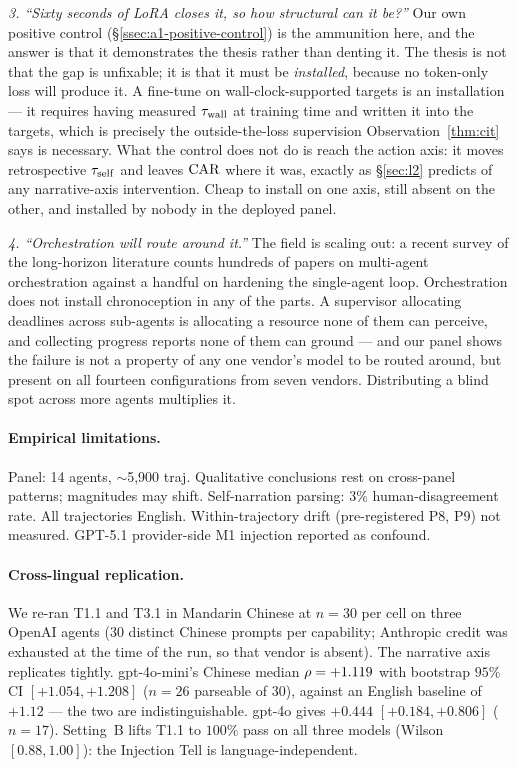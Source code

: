 \emph{3. ``Sixty seconds of LoRA closes it, so how structural can it be?''}
Our own positive control (\S\ref{ssec:a1-positive-control}) is the ammunition
here, and the answer is that it demonstrates the thesis rather than denting it.
The thesis is not that the gap is unfixable; it is that it must be
\emph{installed}, because no token-only loss will produce it. A fine-tune on
wall-clock-supported targets is an installation --- it requires having measured
$\tau_{\mathrm{wall}}$ at training time and written it into the targets, which is precisely
the outside-the-loss supervision Observation~\ref{thm:cit} says is necessary.
What the control does not do is reach the action axis: it moves retrospective
$\tau_{\mathrm{self}}$ and leaves $\mathrm{CAR}$ where it was, exactly as \S\ref{sec:l2} predicts of
any narrative-axis intervention. Cheap to install on one axis, still absent on
the other, and installed by nobody in the deployed panel.

\emph{4. ``Orchestration will route around it.''} The field is scaling out:
a recent survey of the long-horizon literature counts hundreds of papers on
multi-agent orchestration against a handful on hardening the single-agent loop.
Orchestration does not install chronoception in any of the parts. A supervisor
allocating deadlines across sub-agents is allocating a resource none of them
can perceive, and collecting progress reports none of them can ground --- and
our panel shows the failure is not a property of any one vendor's model to be
routed around, but present on all fourteen configurations from seven vendors.
Distributing a blind spot across more agents multiplies it.

\paragraph{Empirical limitations.}
Panel: 14 agents, $\sim$5{,}900 traj. Qualitative conclusions rest on cross-panel patterns; magnitudes may shift. Self-narration parsing: $3\%$ human-disagreement rate. All trajectories English. Within-trajectory drift (pre-registered P8, P9) not measured. GPT-5.1 provider-side M1 injection reported as confound.

\paragraph{Cross-lingual replication.}
We re-ran T1.1 and T3.1 in Mandarin Chinese at $n=30$ per cell on three OpenAI agents (30 distinct Chinese prompts per capability; Anthropic credit was exhausted at the time of the run, so that vendor is absent). The narrative axis replicates tightly. gpt-4o-mini's Chinese median $\rho = +1.119$ with bootstrap $95\%$ CI $[+1.054, +1.208]$ ($n=26$ parseable of 30), against an English baseline of $+1.12$ --- the two are indistinguishable. gpt-4o gives $+0.444$ $[+0.184, +0.806]$ ($n=17$). Setting~B lifts T1.1 to $100\%$ pass on all three models (Wilson $[0.88, 1.00]$): the Injection Tell is language-independent.

